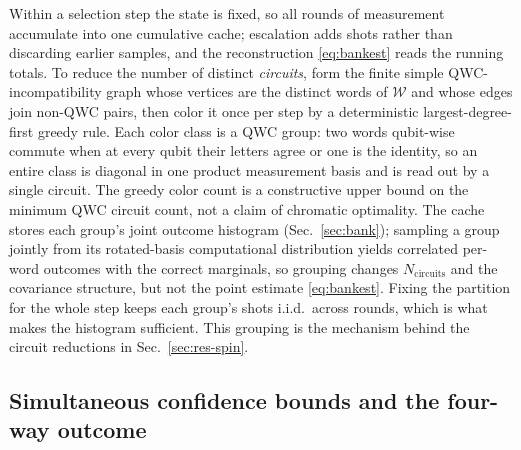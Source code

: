\documentclass[aps,pra,reprint,superscriptaddress,nofootinbib,floatfix]{revtex4-2}
\newcommand{\calW}{\mathcal{W}}
\begin{document}
Within a selection step the state is fixed, so all rounds of measurement accumulate into one cumulative cache; escalation adds shots rather than discarding earlier samples, and the reconstruction \eqref{eq:bankest} reads the running totals. To reduce the number of distinct \emph{circuits}, form the finite simple QWC-incompatibility graph whose vertices are the distinct words of $\calW$ and whose edges join non-QWC pairs, then color it once per step by a deterministic largest-degree-first greedy rule. Each color class is a QWC group: two words qubit-wise commute when at every qubit their letters agree or one is the identity, so an entire class is diagonal in one product measurement basis and is read out by a single circuit. The greedy color count is a constructive upper bound on the minimum QWC circuit count, not a claim of chromatic optimality. The cache stores each group's joint outcome histogram (Sec.~\ref{sec:bank}); sampling a group jointly from its rotated-basis computational distribution yields correlated per-word outcomes with the correct marginals, so grouping changes $N_{\text{circuits}}$ and the covariance structure, but not the point estimate \eqref{eq:bankest}. Fixing the partition for the whole step keeps each group's shots i.i.d.\ across rounds, which is what makes the histogram sufficient. This grouping is the mechanism behind the circuit reductions in Sec.~\ref{sec:res-spin}.

\subsection{Simultaneous confidence bounds and the four-way outcome}
\label{sec:confidence}
\end{document}
